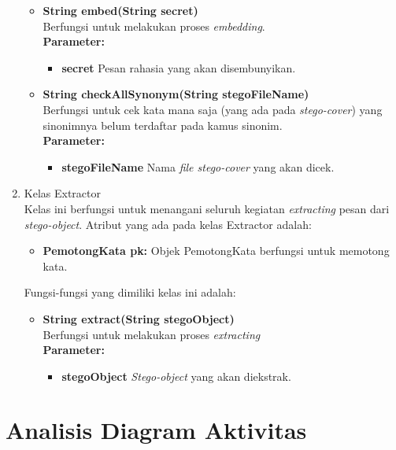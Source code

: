 \begin{enumerate}
\begin{itemize}
		\item \textbf{String embed(String secret)}\\
		Berfungsi untuk melakukan proses \textit{embedding}.\\
		\textbf{Parameter:}
		\begin{itemize}
			\item \textbf{secret} Pesan rahasia yang akan disembunyikan.
		\end{itemize}
		
		\item \textbf{String checkAllSynonym(String stegoFileName)}\\
		Berfungsi untuk cek kata mana saja (yang ada pada \textit{stego-cover}) yang sinonimnya belum terdaftar pada kamus sinonim.\\
		\textbf{Parameter:}
		\begin{itemize}
			\item \textbf{stegoFileName} Nama \textit{file stego-cover} yang akan dicek.
		\end{itemize}
	\end{itemize}
	
	\item Kelas Extractor\\
	Kelas ini berfungsi untuk menangani seluruh kegiatan \textit{extracting} pesan dari \textit{stego-object}. Atribut yang ada pada kelas Extractor adalah:
	\begin{itemize}
		\item \textbf{PemotongKata pk:} Objek PemotongKata berfungsi untuk memotong kata.
	\end{itemize}
	
	Fungsi-fungsi yang dimiliki kelas ini adalah:
	
	\begin{itemize}		
		\item \textbf{String extract(String stegoObject)}\\
		Berfungsi untuk melakukan proses \textit{extracting}\\
		\textbf{Parameter:}
		\begin{itemize}
			\item \textbf{stegoObject} \textit{Stego-object} yang akan diekstrak.
		\end{itemize}
	\end{itemize}
	
\end{enumerate}

\section{Analisis Diagram Aktivitas}

